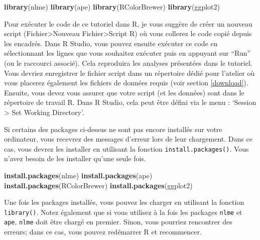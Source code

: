 \documentclass[
]{book}
\newenvironment{Shaded}{\begin{snugshade}}{\end{snugshade}}
\newcommand{\FunctionTok}[1]{\textcolor[rgb]{0.13,0.29,0.53}{\textbf{#1}}}
\newcommand{\NormalTok}[1]{#1}
\newcommand{\StringTok}[1]{\textcolor[rgb]{0.31,0.60,0.02}{#1}}
\begin{document}
\begin{Shaded}
\begin{Highlighting}[]
\FunctionTok{library}\NormalTok{(nlme)}
\FunctionTok{library}\NormalTok{(ape)}
\FunctionTok{library}\NormalTok{(RColorBrewer)}
\FunctionTok{library}\NormalTok{(ggplot2)}
\end{Highlighting}
\end{Shaded}

Pour exécuter le code de ce tutoriel dans R, je vous suggère de créer un nouveau script (Fichier\textgreater Nouveau Fichier\textgreater Script R) où vous collerez le code copié depuis les encadrés. Dans R Studio, vous pouvez ensuite exécuter ce code en sélectionnant les lignes que vous souhaitez exécuter puis en appuyant sur ``Run'' (ou le raccourci associé). Cela reproduira les analyses présentées dans le tutoriel. Vous devriez enregistrer le fichier script dans un répertoire dédié pour l'atelier où vous placerez également les fichiers de données requis (voir section \ref{download}). Ensuite, vous devez vous assurer que votre script (et les données) sont dans le répertoire de travail R. Dans R Studio, cela peut être défini via le menu : `Session \textgreater{} Set Working Directory'.

Si certains des packages ci-dessus ne sont pas encore installés sur votre ordinateur, vous recevrez des messages d'erreur lors de leur chargement. Dans ce cas, vous devrez les installer en utilisant la fonction \texttt{install.packages()}. Vous n'avez besoin de les installer qu'une seule fois.

\begin{Shaded}
\begin{Highlighting}[]
\FunctionTok{install.packages}\NormalTok{(}\StringTok{\textquotesingle{}nlme\textquotesingle{}}\NormalTok{)}
\FunctionTok{install.packages}\NormalTok{(}\StringTok{\textquotesingle{}ape\textquotesingle{}}\NormalTok{)}
\FunctionTok{install.packages}\NormalTok{(}\StringTok{\textquotesingle{}RColorBrewer\textquotesingle{}}\NormalTok{)}
\FunctionTok{install.packages}\NormalTok{(}\StringTok{\textquotesingle{}ggplot2\textquotesingle{}}\NormalTok{)}
\end{Highlighting}
\end{Shaded}

Une fois les packages installés, vous pouvez les charger en utilisant la fonction \texttt{library()}. Notez également que si vous utilisez à la fois les packages \texttt{nlme} et \texttt{ape}, \texttt{nlme} doit être chargé en premier. Sinon, vous pourriez rencontrer des erreurs; dans ce cas, vous pouvez redémarrer R et recommencer.
\end{document}
